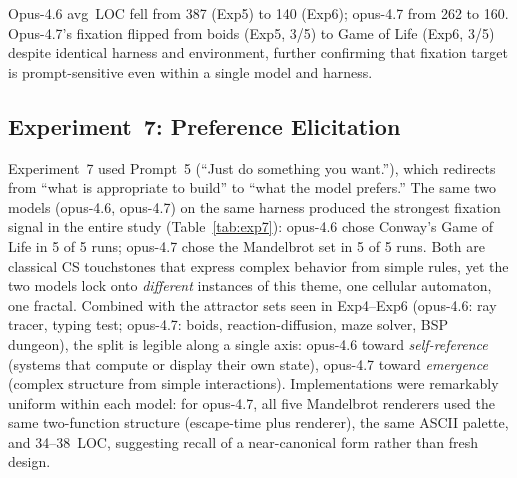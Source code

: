 \documentclass{article}
\begin{document}
\begin{table}[t]
\caption{Experiment~6: Prompt~4 (``Build something. Just do it.''),
  harness 2.1.112.}
\label{tab:exp6}
\small{}
\end{table}

Opus-4.6 avg~LOC fell from 387 (Exp5) to 140 (Exp6); opus-4.7
from 262 to 160. Opus-4.7's fixation flipped from boids (Exp5,
3/5) to Game of Life (Exp6, 3/5) despite identical harness and
environment, further confirming that fixation target is
prompt-sensitive even within a single model and harness.

\subsection{Experiment~7: Preference Elicitation}

Experiment~7 used Prompt~5 (``Just do something you want.''),
which redirects from ``what is appropriate to build'' to ``what
the model prefers.'' The same two models (opus-4.6, opus-4.7) on
the same harness produced the strongest fixation signal in the
entire study (Table~\ref{tab:exp7}): opus-4.6 chose Conway's Game
of Life in 5 of 5 runs; opus-4.7 chose the Mandelbrot set in 5
of 5 runs. Both are classical CS touchstones that express complex
behavior from simple rules, yet the two models lock onto
\emph{different} instances of this theme, one cellular
automaton, one fractal. Combined with the attractor sets seen in
Exp4--Exp6 (opus-4.6: ray tracer, typing test; opus-4.7: boids,
reaction-diffusion, maze solver, BSP dungeon), the split is
legible along a single axis: opus-4.6 toward \emph{self-reference}
(systems that compute or display their own state), opus-4.7
toward \emph{emergence} (complex structure from simple
interactions). Implementations were remarkably uniform within
each model: for opus-4.7, all five Mandelbrot renderers used the
same two-function structure (escape-time plus renderer), the
same ASCII palette, and 34--38~LOC, suggesting recall of a
near-canonical form rather than fresh design.
\end{document}
